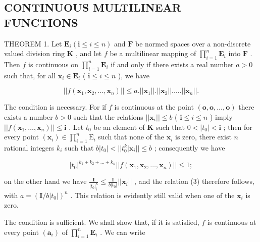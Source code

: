 \subsection{CONTINUOUS MULTILINEAR FUNCTIONS}

THEOREM 1. Let \(\mathbf{E}_i(\mathbf{i} \leqslant i \leqslant n)\) and \(\mathbf{F}\) be normed spaces over a non-discrete valued division ring \(\mathbf{K}\) , and let \(f\) be a multilinear mapping of \(\prod_{i=1}^{n} \mathbf{E}_i\) into \(\mathbf{F}\) . Then \(f\) is continuous on \(\prod_{i=1}^{n} \mathbf{E}_i\) if and only if there exists a real number \(a > 0\) such that, for all \(\boldsymbol{x}_i \in \mathbf{E}_i\) ( \(\mathbf{i} \leqslant i \leqslant n\) ), we have

\[
\left| \left| f \left(\boldsymbol {x} _ {1}, \boldsymbol {x} _ {2}, \dots , \boldsymbol {x} _ {n}\right) \right| \right| \leqslant a. \left| \left| \boldsymbol {x} _ {1} \right| \right|. \left| \left| \boldsymbol {x} _ {2} \right| \right|. \dots . \left| \left| \boldsymbol {x} _ {n} \right| \right|.\tag{3}
\]

The condition is necessary. For if \(f\) is continuous at the point \((\mathbf{o}, \mathbf{o}, \ldots, \mathbf{o})\) there exists a number \(b > 0\) such that the relations \(||\boldsymbol{x}_i|| \leqslant b\) ( \(\mathbf{i} \leqslant i \leqslant n\) ) imply \(||f(\boldsymbol{x}_1, \ldots, \boldsymbol{x}_n)|| \leqslant \mathbf{i}\) . Let \(t_0\) be an element of \(\mathbf{K}\) such that \(0 < |t_0| < \mathbf{i}\) ; then for every point \((\boldsymbol{x}_i) \in \prod_{i=1}^{n} \mathrm{E}_i\) such that none of the \(\boldsymbol{x}_i\) is zero, there exist \(n\) rational integers \(k_i\) such that \(b|t_0| < ||t_0^k |\boldsymbol{x}_i|| \leqslant b\) ; consequently we have

\[
\left| t _ {0} \right| ^ {k _ {1} + k _ {2} + \dots + k _ {n}} \left| \left| f \left(\boldsymbol {x} _ {1}, \boldsymbol {x} _ {2}, \dots , \boldsymbol {x} _ {n}\right) \right| \right| \leqslant 1;
\]

on the other hand we have \(\frac{\mathbf{I}}{|t_0|^k_i} \leqslant \frac{\mathbf{I}}{b|t_0|} ||\boldsymbol{x}_i||\) , and the relation (3) therefore follows, with \(a = (\mathbf{I}/b|t_0|)^n\) . This relation is evidently still valid when one of the \(\boldsymbol{x}_i\) is zero.

The condition is sufficient. We shall show that, if it is satisfied, \(f\) is continuous at every point \((\pmb{a}_i)\) of \(\prod_{i=1}^{n} \mathbf{E}_i\) . We can write

